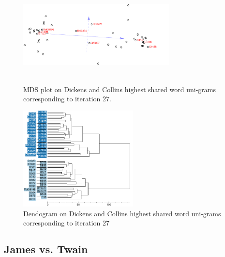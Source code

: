 \documentclass[a4paper,10pt,twoside,fleqn]{article}
\begin{document}
\begin{figure}
\centering
\parbox{8cm}{
\includegraphics[width=8cm,height=4.5cm]{mdsplot/dc-wuni-DC1423.pdf}
\caption{MDS plot on Dickens and Collins highest shared word uni-grams 
corresponding to iteration 27.}
\label{fig:dc-unigram-mdsplot}}
\qquad
\begin{minipage}{6cm}
\includegraphics[width=6cm]{dend/dc-wuni-cl-DC1423.pdf}
\caption{Dendogram on Dickens and Collins highest shared word uni-grams 
corresponding to iteration 27}
\label{fig:dc-unigram-dendo}
\end{minipage}
\end{figure}


\subsection{James vs. Twain} \label{sec:twain-james}
\end{document}
